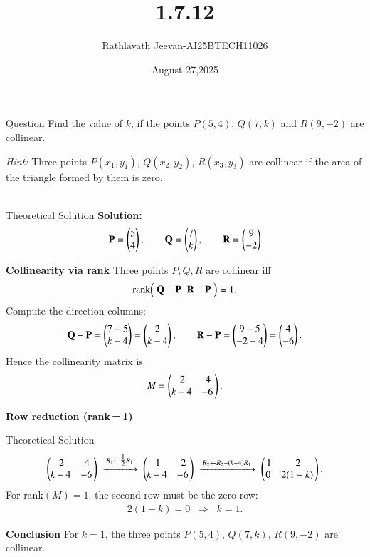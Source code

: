 \documentclass{beamer}
\title %
{1.7.12}
\date{August 27,2025}
\author %
{Rathlavath Jeevan-AI25BTECH11026}
\begin{document}
\frame{\titlepage}
\begin{frame}{Question}
\textbf{} Find the value of $k$, if the points $P(5,4)$, $Q(7,k)$ and $R(9,-2)$ are collinear. 

\textit{Hint:} Three points $P(x_1,y_1)$, $Q(x_2,y_2)$, $R(x_3,y_3)$ are collinear if the area of the triangle formed by them is zero.\\
\\
\end{frame}


\begin{frame}{Theoretical Solution}
\textbf{Solution:} \\
\begin{align}
\mathbf P=\begin{pmatrix}5\\4\end{pmatrix},\qquad
\mathbf Q=\begin{pmatrix}7\\k\end{pmatrix},\qquad
\mathbf R=\begin{pmatrix}9\\-2\end{pmatrix}
\end{align}

 \textbf{Collinearity via rank}
Three points \(P,Q,R\) are collinear iff
\begin{align}
\operatorname{rank}\!\begin{pmatrix}\; \mathbf Q-\mathbf P \;\; \mathbf R-\mathbf P \;\end{pmatrix}=1.
\end{align}
Compute the direction columns:
\begin{align}
\mathbf Q-\mathbf P=\begin{pmatrix}7-5\\k-4\end{pmatrix}=\begin{pmatrix}2\\k-4\end{pmatrix},\qquad
\mathbf R-\mathbf P=\begin{pmatrix}9-5\\-2-4\end{pmatrix}=\begin{pmatrix}4\\-6\end{pmatrix}.
\end{align}
Hence the collinearity matrix is
\begin{align}
M=\begin{pmatrix}\,2 & 4\\ k-4 & -6\,\end{pmatrix}.
\end{align}

\textbf{Row reduction (rank\,=\,1)}
\end{frame}
\begin{frame}{Theoretical Solution}
\begin{align}
\begin{pmatrix}\,2 & 4\\k-4 & -6\,\end{pmatrix}
\;\xrightarrow{\,R_1\leftarrow \tfrac12 R_1\,}\;
\begin{pmatrix}\,1 & 2\\k-4 & -6\,\end{pmatrix}
\;\xrightarrow{\,R_2\leftarrow R_2-(k-4)R_1\,}\;
\begin{pmatrix}\,1 & 2\\0 & 2(1-k)\,\end{pmatrix}.
\end{align}
For rank\((M)=1\), the second row must be the zero row:
\begin{align}
2(1-k)=0 \;\;\Rightarrow\;\; k=1.
\end{align}

\textbf{Conclusion}
For \(k=\boxed{1}\), the three points \(P(5,4),\,Q(7,k),\,R(9,-2)\) are collinear.


\end{frame}
\end{document}
